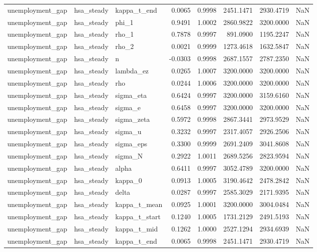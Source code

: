 \begin{tabular}{lllrrrrl}
unemployment\_gap & hsa\_steady & kappa\_t\_end & 0.0065 & 0.9998 & 2451.1471 & 2930.4719 & NaN \\
unemployment\_gap & hsa\_steady & phi\_1 & 0.9491 & 1.0002 & 2860.9822 & 3200.0000 & NaN \\
unemployment\_gap & hsa\_steady & rho\_1 & 0.7878 & 0.9997 & 891.0900 & 1195.2247 & NaN \\
unemployment\_gap & hsa\_steady & rho\_2 & 0.0021 & 0.9999 & 1273.4618 & 1632.5847 & NaN \\
unemployment\_gap & hsa\_steady & n & -0.0303 & 0.9998 & 2687.1557 & 2787.2350 & NaN \\
unemployment\_gap & hsa\_steady & lambda\_ez & 0.0265 & 1.0007 & 3200.0000 & 3200.0000 & NaN \\
unemployment\_gap & hsa\_steady & rho & 0.0244 & 1.0006 & 3200.0000 & 3200.0000 & NaN \\
unemployment\_gap & hsa\_steady & sigma\_eta & 0.6424 & 0.9997 & 3200.0000 & 3159.6160 & NaN \\
unemployment\_gap & hsa\_steady & sigma\_e & 0.6458 & 0.9997 & 3200.0000 & 3200.0000 & NaN \\
unemployment\_gap & hsa\_steady & sigma\_zeta & 0.5972 & 0.9998 & 2867.3441 & 2973.9529 & NaN \\
unemployment\_gap & hsa\_steady & sigma\_u & 0.3232 & 0.9997 & 2317.4057 & 2926.2506 & NaN \\
unemployment\_gap & hsa\_steady & sigma\_eps & 0.3300 & 0.9999 & 2691.2409 & 3041.8608 & NaN \\
unemployment\_gap & hsa\_steady & sigma\_N & 0.2922 & 1.0011 & 2689.5256 & 2823.9594 & NaN \\
unemployment\_gap & hsa\_steady & alpha & 0.6411 & 0.9997 & 3052.4789 & 3200.0000 & NaN \\
unemployment\_gap & hsa\_steady & kappa\_0 & 0.0913 & 1.0005 & 3190.4642 & 2478.2842 & NaN \\
unemployment\_gap & hsa\_steady & delta & 0.0287 & 0.9997 & 2585.3029 & 2171.9395 & NaN \\
unemployment\_gap & hsa\_steady & kappa\_t\_mean & 0.0925 & 1.0001 & 3200.0000 & 3004.0484 & NaN \\
unemployment\_gap & hsa\_steady & kappa\_t\_start & 0.1240 & 1.0005 & 1731.2129 & 2491.5193 & NaN \\
unemployment\_gap & hsa\_steady & kappa\_t\_mid & 0.1262 & 1.0000 & 2527.1294 & 2934.6939 & NaN \\
unemployment\_gap & hsa\_steady & kappa\_t\_end & 0.0065 & 0.9998 & 2451.1471 & 2930.4719 & NaN \\

\end{tabular}
